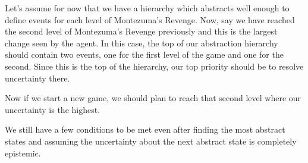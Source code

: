 \documentclass{article}
\begin{document}







Let's assume for now that we have a hierarchy which abstracts well enough to define events for each level of Montezuma's Revenge. Now, say we have reached the second level of Montezuma's Revenge previously and this is the largest change seen by the agent. In this case, the top of our abstraction hierarchy should contain two events, one for the first level of the game and one for the second. Since this is the top of the hierarchy, our top priority should be to resolve uncertainty there.

Now if we start a new game, we should plan to reach that second level where our uncertainty is the highest.

We still have a few conditions to be met even after finding the most abstract states and assuming the uncertainty about the next abstract state is completely epistemic.



\end{document}
